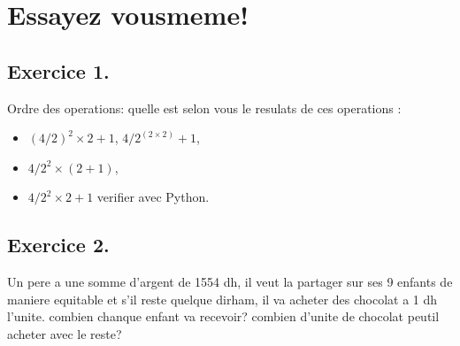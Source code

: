 \documentclass[letterpaper,10pt,french]{sphinxmanual}
\begin{document}
\section{Essayez vous\sphinxhyphen{}meme!}
\label{\detokenize{exo2:essayez-vous-meme}}\label{\detokenize{exo2::doc}}



\subsection{Exercice 1.}
\label{\detokenize{exo2:exercice-1}}
\sphinxAtStartPar
Ordre des operations: quelle est selon vous le resulats de ces operations :
\begin{itemize}
\item {} 
\sphinxAtStartPar
\((4/2)^2\times 2 + 1\), \(4/2^{(2\times 2)} + 1\),

\item {} 
\sphinxAtStartPar
\(4/2^2\times (2 + 1)\),

\item {} 
\sphinxAtStartPar
\(4/2^2\times 2 + 1\)
verifier avec Python.

\end{itemize}

\begin{sphinxVerbatim}[commandchars=\\\{\}]
\end{sphinxVerbatim}




\subsection{Exercice 2.}
\label{\detokenize{exo2:exercice-2}}
\sphinxAtStartPar
Un pere a une somme d’argent de 1554 dh, il veut la partager sur ses 9 enfants de maniere equitable et s’il reste quelque dirham, il va acheter des chocolat a 1 dh l’unite. combien chanque enfant va recevoir? combien d’unite de chocolat peut\sphinxhyphen{}il acheter avec le reste?

\begin{sphinxVerbatim}[commandchars=\\\{\}]
\end{sphinxVerbatim}
\end{document}
